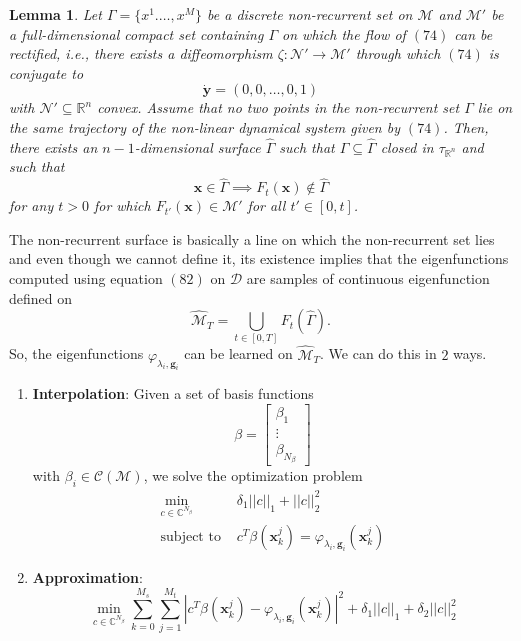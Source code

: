 \documentclass[]{article}
\newtheorem{lemma}{Lemma}
\begin{document}
\begin{lemma}
Let $\Gamma=\{x^1.\dots,x^M\}$ be a discrete non-recurrent set on $\mathcal{M}$ and $\mathcal{M}'$ be a full-dimensional compact set containing $\Gamma$ on which the flow of $(74)$ can be rectified, i.e., there exists a diffeomorphism $\zeta:\mathcal{N}' \to \mathcal{M}'$ through which $(74)$ is conjugate to 
\begin{equation}
	\dot{\textbf{y}}=(0,0,\dots,0,1)
\end{equation}
with $\mathcal{N}' \subseteq \mathbb{R}^n$ convex. Assume that no two points in the non-recurrent set $\Gamma$ lie on the same trajectory of the non-linear dynamical system given by $(74)$. Then, there exists an $n-1$-dimensional surface $\hat{\Gamma}$ such that $\Gamma \subseteq \hat{\Gamma}$ closed in $\tau_{\mathbb{R}^n}$ and such that 
\begin{equation}
	\textbf{x} \in \hat{\Gamma} \implies F_t(\textbf{x}) \notin \hat{\Gamma}
\end{equation}
for any $t>0$ for which $F_{t'}(\textbf{x}) \in \mathcal{M}'$ for all $t' \in [0,t]$.
\end{lemma}
The non-recurrent surface is basically a line on which the non-recurrent set lies and even though we cannot define it, its existence implies that the eigenfunctions computed using equation $(82)$ on $\mathcal{D}$ are samples of continuous eigenfunction defined on
\begin{equation}
	\hat{\mathcal{M}}_T = \bigcup_{t \in [0,T]} F_t(\hat{\Gamma}).
\end{equation}
So, the eigenfunctions $\varphi_{\lambda_i, \textbf{g}_i}$ can be learned on $\hat{\mathcal{M}}_T$. We can do this in $2$ ways.
\begin{enumerate}
	\item \textbf{Interpolation}:
	Given a set of basis functions
	\begin{equation}
		\beta = \begin{bmatrix}
			\beta_1 \\
			\vdots \\
			\beta_{N_{\beta}}
		\end{bmatrix}
	\end{equation}
	with $\beta_i \in \mathcal{C}(\mathcal{M})$, we solve the optimization problem
	\begin{equation}
		\begin{split}
			\min_{c \in \mathbb{C}^{N_{\beta}}} & \delta_1 ||c||_1+||c||_2^2 \\
			\text{subject to} \,\, &  c^T\beta(\textbf{x}_k^j) = \varphi_{\lambda_i,\textbf{g}_i}(\textbf{x}_k^j)
		\end{split}
	\end{equation}
	\item \textbf{Approximation}:
	\begin{equation}
		\min_{c \in \mathbb{C}^{N_{\beta}}} \sum_{k=0}^{M_s} \sum_{j=1}^{M_t} |c^T\beta(\textbf{x}_k^j) - \varphi_{\lambda_i,\textbf{g}_i}(\textbf{x}_k^j)|^2 + \delta_1 ||c||_1+\delta_2||c||_2^2
	\end{equation}
\end{enumerate}
\end{document}
